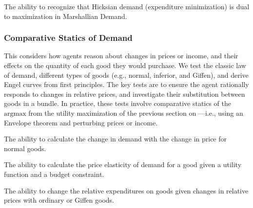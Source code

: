 \begin{el}
    {The ability to recognize that Hicksian demand (expenditure minimization) is dual to maximization in Marshallian Demand.}
\end{el}




\subsubsection{Comparative Statics of Demand}\label{mod:properties_demand}

This \child considers how agents reason about changes in prices or income, and their effects on the quantity of each good they would purchase. We test the classic law of demand, different types of goods (e.g., normal, inferior, and Giffen), and derive Engel curves from first principles.  The key tests are to ensure the agent rationally responds to changes in relative prices, and investigate their substitution between goods in a bundle.  In practice, these tests involve comparative statics of the $\mathrm{argmax}$ from the utility maximization of the previous section on ---i.e., using an Envelope theorem and perturbing prices or income.

\begin{el}
    {The ability to calculate the change in demand with the change in price for normal goods.}
\end{el}

\begin{el}\label{el:price_elasticity_demand}
    {The ability to calculate the price elasticity of demand for a good given a utility function and a budget constraint.}
\end{el}

\begin{el}
    {The ability to change the relative expenditures on goods given changes in relative prices with ordinary or Giffen goods.}
\end{el}





